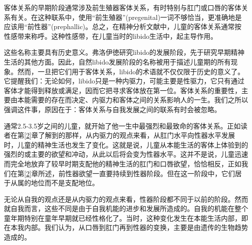 \documentclass[UTF8,10pt,a4paper,openany]{book}
\begin{document}
客体关系的早期阶段通常涉及前生殖器客体关系，有时特别与肛门或口唇的客体关系有关。在这种联系中，使用“前生殖器”(pregenital)一词不够恰当，更准确地是应该用“前性器”(prephallic)。总之，在精神分析文献中，儿童的客体关系通常按性感带来称呼。这种性感带，在儿童当时的libido生活中，起主导作用。

这些名称主要具有历史意义。弗洛伊徳研究libido的发展阶段，先于研究早期精神生活的其他方面。因此，自然libido发展阶段的名称被用于描述儿童期的所有现象。然而，一旦把它们用于客体关系，libido的术语就不仅仅限于历史的意义了。它提醒我们：无论如何，libido只是一种内驱力，可能主要是性驱力，它只有通过客体才能得到释放或满足，因而它把寻求客体放在第一位。客体关系的重要性，主要由本能需要的存在而决定、内驱力和客体之间的关系影响人的一生。我们之所以强调这件事，原因在于：客体关系与自我发展之间的联系有时会被忽略。

通常2.5-3.5岁之间的儿童，就开始了他一生中最强烈和最致命的客体关系。正如读者在第\ref{2}章了解到的那样，从内驱力的观点来看，从肛门水平向性器水平发展时，儿童的精神生活也发生了变化。这就是说，儿童从本能生活的客体上体验到的强烈的或主要的欲望和冲动，从此以后将会变为性器水平。这并不是说，儿童迅速而完全地放弃了较早时期支配他的精神生活的肛门和口唇欲望，恰恰相反，正如我们在第\ref{2}章所述，前性器欲望一直要持续到性器阶段。但在这一阶段中，它们居于从属的地位而不是支配地位。

无论从自我的观点还是从内驱力的观点来看，性器阶段都不同于以前的阶段。然而就自我而言，这些不同是由于自我机能的进步和发展所造成的。自我的机能在整个童年期特别在童年早期就已经性格化了。当时，这种变化发生在本能生活内部，即在本我内部。我们认为，从口唇到肛门再到性器的变换，主要是由遗传的生物趋势造成的。
\end{document}
